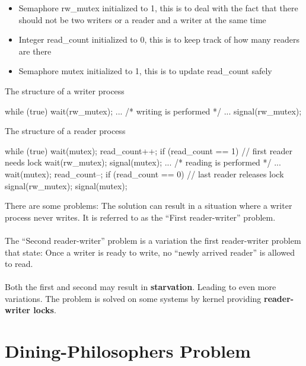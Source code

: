 \begin{itemize}
    \item Semaphore rw\_mutex initialized to 1, this is to deal with the fact that there should not be two writers or a reader and a writer at the same time
    \item Integer read\_count initialized to 0, this is to keep track of how many readers are there
    \item Semaphore mutex initialized to 1, this is to update read\_count safely
\end{itemize}

\newpage
The structure of a writer process

\begin{codeInC}
while (true) {
    wait(rw_mutex);
        ...
        /* writing is performed */
        ...
    signal(rw_mutex);
}
\end{codeInC}

The structure of a reader process


\begin{codeInC}
while (true){
    wait(mutex);
    read_count++;
    if (read_count == 1) // first reader needs lock
        wait(rw_mutex);
    signal(mutex);
    ...
    /* reading is performed */
    ...
    wait(mutex);
    read_count--;
    if (read_count == 0) // last reader releases lock
        signal(rw_mutex);
    signal(mutex);
}
\end{codeInC}

There are some problems:
The solution can result in a situation where
a writer process never writes. It is referred to as the “First
reader-writer” problem.

\paragraph{}
The “Second reader-writer” problem is a variation the first
reader-writer problem that state: Once a writer is ready to write, no “newly arrived
reader” is allowed to read.

\paragraph{}
Both the first and second may result in \textbf{starvation}. Leading to
even more variations. The problem is solved on some systems by kernel providing
\textbf{reader-writer locks}.

\newpage
\section{Dining-Philosophers Problem}

